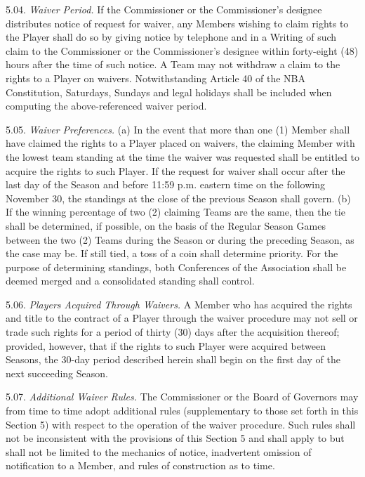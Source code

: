 \documentclass[
]{book}
\begin{document}
5.04. \emph{Waiver Period.} If the Commissioner or the Commissioner's designee distributes notice of request for waiver, any Members wishing to claim rights to the Player shall do so by giving notice by telephone and in a Writing of such claim to the Commissioner or the Commissioner's designee within forty-eight (48) hours after the time of such notice. A Team may not withdraw a claim to the rights to a Player on waivers. Notwithstanding Article 40 of the NBA Constitution, Saturdays, Sundays and legal holidays shall be included when computing the above-referenced waiver period.

5.05. \emph{Waiver Preferences.}
(a) In the event that more than one (1) Member shall have claimed the rights to a Player placed on waivers, the claiming Member with the lowest team standing at the time the waiver was requested shall be entitled to acquire the rights to such Player. If the request for waiver shall occur after the last day of the Season and before 11:59 p.m. eastern time on the following November 30, the standings at the close of the previous Season shall govern.
(b) If the winning percentage of two (2) claiming Teams are the same, then the tie shall be determined, if possible, on the basis of the Regular Season Games between the two (2) Teams during the Season or during the preceding Season, as the case may be. If still tied, a toss of a coin shall determine priority. For the purpose of determining standings, both Conferences of the Association shall be deemed merged and a consolidated standing shall control.

5.06. \emph{Players Acquired Through Waivers.} A Member who has acquired the rights and title to the contract of a Player through the waiver procedure may not sell or trade such rights for a period of thirty (30) days after the acquisition thereof; provided, however, that if the rights to such Player were acquired between Seasons, the 30-day period described herein shall begin on the first day of the next succeeding Season.

5.07. \emph{Additional Waiver Rules.} The Commissioner or the Board of Governors may from time to time adopt additional rules (supplementary to those set forth in this Section 5) with respect to the operation of the waiver procedure. Such rules shall not be inconsistent with the provisions of this Section 5 and shall apply to but shall not be limited to the mechanics of notice, inadvertent omission of notification to a Member, and rules of construction as to time.

\newpage
\end{document}
